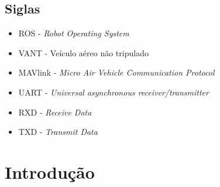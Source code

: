 \documentclass[12pt,a4paper,oneside]{book}
\begin{document}
%
\listoffigures
%
%
\thispagestyle{myheadings}
%


%
\listoftables
%
%
\thispagestyle{myheadings}
%


%
\tableofcontents
%
\thispagestyle{myheadings}

\clearpage



%



\section{Siglas}
\begin{itemize}
    \item ROS - \textit{Robot Operating System}
    \item VANT - Veículo aéreo não tripulado
    \item MAVlink - \textit{Micro Air Vehicle Communication Protocol}
    \item UART - \textit{Universal asynchronous receiver/transmitter} 
    \item RXD - \textit{Receive Data}
    \item TXD - \textit{Transmit Data}
\end{itemize}



\chapter{Introdução}
%
\thispagestyle{empty} 
%
%
\end{document}
